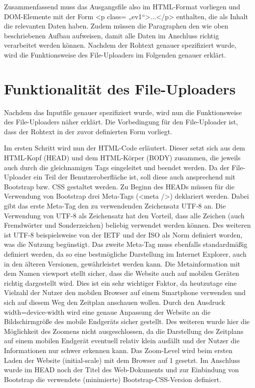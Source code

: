 {Zusammenfassend muss das Ausgangsfile also im HTML-Format vorliegen und DOM-Elemente mit der Form <p class= „ev1“>...</p> enthalten, die als Inhalt die relevanten Daten haben. Zudem müssen die Paragraphen den wie oben beschriebenen Aufbau aufweisen, damit alle Daten im Anschluss richtig verarbeitet werden können. 
Nachdem der Rohtext genauer spezifiziert wurde, wird die Funktionsweise des File-Uploaders im Folgenden genauer erklärt.

\section{Funktionalität des File-Uploaders}
Nachdem das Inputfile genauer spezifiziert wurde, wird nun die Funktionsweise des File-Uploaders näher erklärt. Die Vorbedingung für den File-Uploader ist, dass der Rohtext in der zuvor definierten Form vorliegt.

Im ersten Schritt wird nun der HTML-Code erläutert. Dieser setzt sich aus dem HTML-Kopf (HEAD) und dem HTML-Körper (BODY) zusammen, die jeweils auch durch die gleichnamigen Tags eingeleitet und beendet werden. Da der File-Uploader ein Teil der Benutzeroberfläche ist, soll diese auch ansprechend mit Bootstrap bzw. CSS gestaltet werden. Zu Beginn des HEADs müssen für die Verwendung von Bootstrap drei Meta-Tags (<meta />) deklariert werden. 
Dabei gibt das erste Meta-Tag den zu verwendenden Zeichensatz \ac{UTF-8} an. Die Verwendung von UTF-8 als Zeichensatz hat den Vorteil, dass alle Zeichen (auch Fremdwörter und Sonderzeichen) beliebig verwendet werden können. Des weiteren ist UTF-8 beispielsweise von der \ac{IETF} und der \ac{ISO} als Norm definiert worden, was die Nutzung begünstigt. 
Das zweite Meta-Tag muss ebenfalls standardmäßig definiert werden, da so eine bestmögliche Darstellung im Internet Explorer, auch in den älteren Versionen, gewährleistet werden kann. 
Die Metainformation mit dem Namen viewport stellt sicher, dass die Website auch auf mobilen Geräten richtig dargestellt wird. Dies ist ein sehr wichtiger Faktor, da heutzutage eine Vielzahl der Nutzer den mobilen Browser auf einem Smartphone verwenden und sich auf diesem Weg den Zeitplan anschauen wollen. Durch den Ausdruck width=device-width wird eine genaue Anpassung der Website an die Bildschirmgröße des mobile Endgeräts sicher gestellt. Des weiteren wurde hier die Möglichkeit des Zoomens nicht ausgeschlossen, da die Darstellung des Zeitplans auf einem mobilen Endgerät eventuell relativ klein ausfällt und der Nutzer die Informationen nur schwer erkennen kann. Das Zoom-Level wird beim ersten Laden der Website (initial-scale) mit dem Browser auf 1 gesetzt. 
Im Anschluss wurde im HEAD noch der Titel des Web-Dokuments und zur Einbindung von Bootstrap die verwendete (minimierte) Bootstrap-CSS-Version definiert. 

}
